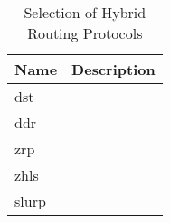 \begin{table}\centering
  \caption[Selection of Hybrid Routing Protocols]{Selection of Hybrid Routing Protocols}
  \label{tab:hybrid_routing_protocols}
  \begin{tabularx}{\textwidth}{p{1.25cm}|X}\toprule
    Name & Description \\ \midrule
    \gls{dst} & \\
    \gls{ddr} & \\
    \gls{zrp} & \\
    \gls{zhls} & \\
    \gls{slurp} & \\
    
    \bottomrule
  \end{tabularx}
\end{table}


